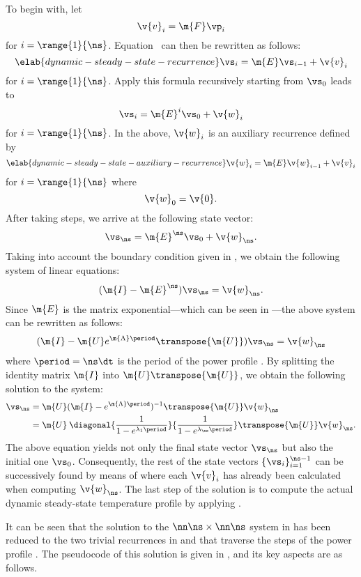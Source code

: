 To begin with, let
\[
  \v{v}_i = \m{F} \vp_i
\]
for $i = \range{1}{\ns}$. Equation~ can then be
rewritten as follows:
\begin{equation} \elab{dynamic-steady-state-recurrence}
  \vs_i = \m{E} \vs_{i - 1} + \v{v}_i
\end{equation}
for $i = \range{1}{\ns}$. Apply this formula recursively starting from $\vs_0$
leads to
\[
  \vs_i = \m{E}^i \vs_0 + \v{w}_i
\]
for $i = \range{1}{\ns}$. In the above, $\v{w}_i$ is an auxiliary recurrence
defined by
\begin{equation} \elab{dynamic-steady-state-auxiliary-recurrence}
  \v{w}_i = \m{E} \v{w}_{i - 1} + \v{v}_i
\end{equation}
for $i = \range{1}{\ns}$ where
\[
  \v{w}_0 = \v{0}.
\]
After taking \ns steps, we arrive at the following state vector:
\[
  \vs_\ns = \m{E}^\ns \vs_0 + \v{w}_\ns.
\]
Taking into account the boundary condition given in
, we obtain the following system of linear
equations:
\[
  (\m{I} - \m{E}^\ns) \vs_\ns = \v{w}_\ns.
\]
Since $\m{E}$ is the matrix exponential---which can be seen in
---the above system can be rewritten as follows:
\[
  (\m{I} - \m{U} e^{\m{\Lambda} \period} \transpose{\m{U}}) \vs_\ns = \v{w}_\ns
\]
where $\period = \ns \dt$ is the period of the power profile \mp. By splitting
the identity matrix $\m{I}$ into $\m{U} \transpose{\m{U}}$, we obtain the
following solution to the system:
\begin{align*}
  \vs_\ns
  & = \m{U} (\m{I} - e^{\m{\Lambda} \period})^{-1} \transpose{\m{U}} \v{w}_\ns \\
  & = \m{U} \: \diagonal{\frac{1}{1 - e^{\lambda_1 \period}}}{\frac{1}{1 - e^{\lambda_\ns \period}}} \transpose{\m{U}} \v{w}_\ns.
\end{align*}
The above equation yields not only the final state vector $\vs_\ns$ but also the
initial one $\vs_0$. Consequently, the rest of the state vectors $\{ \vs_i \}_{i
= 1}^{\ns - 1}$ can be successively found by means of
 where each $\v{v}_i$ has already been
calculated when computing $\v{w}_\ns$. The last step of the solution is to
compute the actual dynamic steady-state temperature profile \mq by applying
.

It can be seen that the solution to the $\nn \ns \times \nn \ns$ system in
 has been reduced to the two trivial
recurrences in  and
 that traverse the \ns steps of
the power profile \mp. The pseudocode of this solution is given in
, and its key aspects are as follows.

